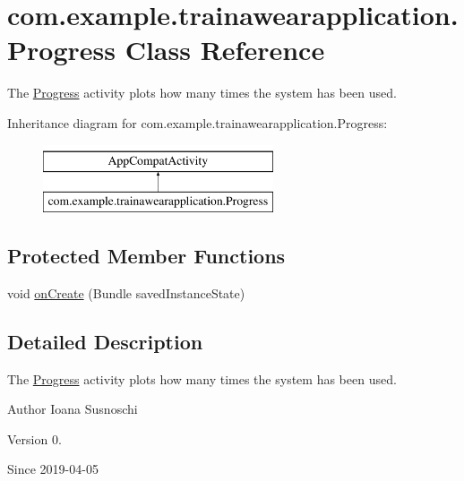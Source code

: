 \hypertarget{classcom_1_1example_1_1trainawearapplication_1_1_progress}{}\section{com.\+example.\+trainawearapplication.\+Progress Class Reference}
\label{classcom_1_1example_1_1trainawearapplication_1_1_progress}


The \mbox{\hyperlink{classcom_1_1example_1_1trainawearapplication_1_1_progress}{Progress}} activity plots how many times the system has been used.  


Inheritance diagram for com.\+example.\+trainawearapplication.\+Progress\+:\begin{figure}[H]
\begin{center}
\leavevmode
\includegraphics[height=2.000000cm]{classcom_1_1example_1_1trainawearapplication_1_1_progress}
\end{center}
\end{figure}
\subsection*{Protected Member Functions}
\begin{DoxyCompactItemize}
\item 
void \mbox{\hyperlink{classcom_1_1example_1_1trainawearapplication_1_1_progress_a839ad2f2cb526d70b32c517f54400f36}{on\+Create}} (Bundle saved\+Instance\+State)
\end{DoxyCompactItemize}


\subsection{Detailed Description}
The \mbox{\hyperlink{classcom_1_1example_1_1trainawearapplication_1_1_progress}{Progress}} activity plots how many times the system has been used. 

\begin{DoxyAuthor}{Author}
Ioana Susnoschi 
\end{DoxyAuthor}
\begin{DoxyVersion}{Version}
0. 
\end{DoxyVersion}
\begin{DoxySince}{Since}
2019-\/04-\/05 
\end{DoxySince}


